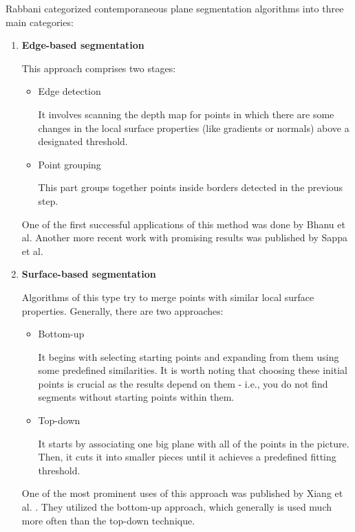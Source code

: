 Rabbani \cite{articleSegPointCloudsSmoothnessConstraint} categorized contemporaneous plane segmentation algorithms
into three main categories:
\begin{enumerate}
\item \textbf{Edge-based segmentation}

This approach comprises two stages:

\begin{itemize}

\item Edge detection

It involves scanning the depth map for points in which there are some changes
in the local surface properties (like gradients or normals) above a designated threshold.

\item Point grouping

This part groups together points inside borders detected in the previous step.

\end{itemize}

One of the first successful applications of this method was done by Bhanu et al. \cite{Bhanu1986RANGEDP}
Another more recent work with promising results was published by Sappa et al. \cite{SappaEdgeDetectionStrategy}

\item \textbf{Surface-based segmentation}

Algorithms of this type try to merge points with similar local surface properties. Generally, there are two approaches:

\begin{itemize}

\item Bottom-up

It begins with selecting starting points and expanding from them using some predefined similarities.
It is worth noting that choosing these initial points is crucial as the results depend on them - i.e.,
you do not find segments without starting points within them.

\item Top-down

It starts by associating one big plane with all of the points in the picture.
Then, it cuts it into smaller pieces until it achieves a predefined fitting threshold.

\end{itemize}

One of the most prominent uses of this approach was published by Xiang et al. \cite{XiangSurfaceBasedSegmentation}.
They utilized the bottom-up approach, which generally is used much more often than the top-down technique.


\end{enumerate}
